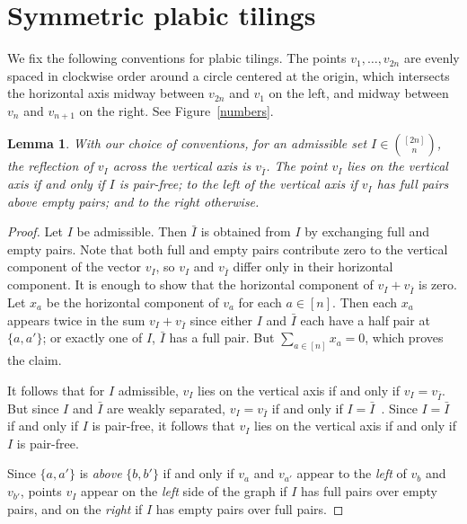 \documentclass[10pt]{amsart}
\newtheorem{lemm}[theo]{Lemma}
\theoremstyle{definition}
\begin{document}
\section{Symmetric plabic tilings}
\label{sym_tilings}

We fix the following conventions for plabic tilings. The points $v_1,\ldots,v_{2n}$ are evenly spaced in 
clockwise order around a circle centered at the origin, which intersects the horizontal axis midway between $v_{2n}$ and $v_1$ on the left, and midway between $v_n$ and $v_{n+1}$ on the right. See Figure~\ref{numbers}. 

\begin{lemm}
\label{reflect_vert}
With our choice of conventions, for an admissible set $I \in \binom{[2n]}{n}$, the reflection of $v_I$ across the vertical axis is $v_{\bar{I}}$. The point $v_I$ lies on the vertical axis if and only if $I$ is pair-free; to the left of the vertical axis if $v_I$ has full pairs above empty pairs; and to the right otherwise.
\end{lemm}

\begin{proof}
Let $I$ be admissible. Then $\bar{I}$ is obtained from $I$ by exchanging full and empty pairs.
Note that both full and empty pairs contribute zero to the vertical component of the vector $v_I$, so $v_I$ and $v_{\bar{I}}$ differ only in their horizontal component. It is enough to show that the horizontal component of $v_I + v_{\bar{I}}$ is zero. Let $x_a$ be the horizontal component of $v_a$ for each $a \in [n]$. Then each $x_a$ appears twice in the sum $v_{I} + v_{\bar{I}}$ since either $I$ and $\bar{I}$ each have a half pair at $\{a,a'\}$; or exactly one of $I$, $\bar{I}$ has a full pair. 
But $\sum_{a \in [n]}x_a = 0$, which proves the claim.


It follows that for $I$ admissible, $v_I$ lies on the vertical axis if and only if $v_I = v_{\bar{I}}$. But since $I$ and $\bar{I}$ are weakly separated, $v_{I} = v_{\bar{I}}$ if and only if $I = \bar{I}$~\cite{OPS15}. Since $I = \bar{I}$ if and only if $I$ is pair-free, it follows that $v_I$ lies on the vertical axis if and only if $I$ is pair-free.

Since $\{a,a'\}$ is \emph{above} $\{b,b'\}$ if and only if $v_a$ and $v_{a'}$ appear to the \emph{left} of $v_b$ and $v_{b'}$, points $v_I$ appear on the \emph{left} side of the graph if $I$ has full pairs over empty pairs, and on the \emph{right} if $I$ has empty pairs over full pairs. \end{proof}
\end{document}
